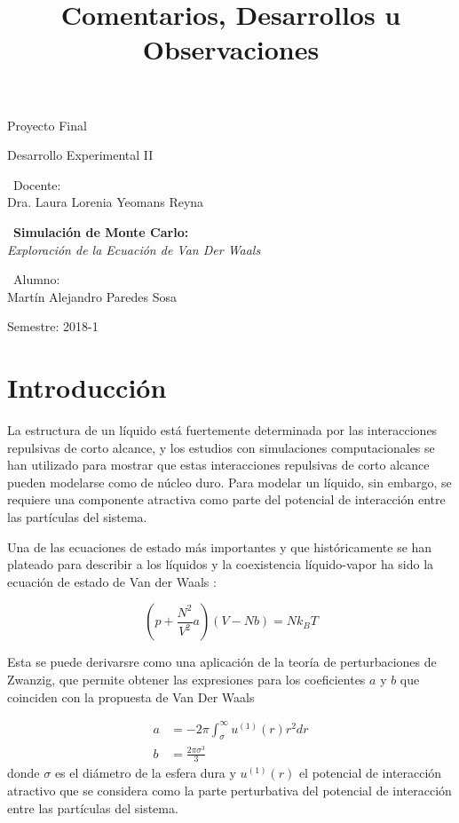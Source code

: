 \documentclass[12pt,letterpaper]{article}
\title{ Comentarios, Desarrollos u Observaciones  }
\begin{document}
\begin{titlepage}
	\centering
    \vspace*{2cm}
	{\Large Proyecto Final \par}
	\vfill
	{\Large Desarrollo Experimental II \par}
	\vfill
	{\large\ Docente:\\ Dra. Laura Lorenia Yeomans Reyna \par}
    \vfill
    {\large\ \textbf{Simulación de Monte Carlo:}\\ 
    \emph{Exploración de la Ecuación de Van Der Waals}\par}
    \vfill
    {\large\ Alumno:\\ Martín Alejandro Paredes Sosa \par}
	\vfill
	{\large Semestre: 2018-1\par}
\end{titlepage}

\section{Introducción}
	
	La estructura de un líquido está fuertemente determinada por las interacciones repulsivas de corto alcance, y  los estudios con simulaciones computacionales se han utilizado para mostrar que estas interacciones repulsivas de corto alcance pueden modelarse como de núcleo duro. Para modelar un líquido, sin embargo, se requiere una componente atractiva como parte del potencial de interacción entre las partículas del sistema.  

Una de las ecuaciones de estado más importantes y que históricamente se han plateado para describir a los líquidos y la coexistencia líquido-vapor ha sido la ecuación de estado de Van der Waals \cite{Modern}:

\begin{equation}
	\left( p + \frac{N^2}{V^2}a \right) \left( V -Nb \right) = Nk_B T
	\label{VanDerWaals}
\end{equation}

Esta se puede derivarsre como una aplicación de la teoría de perturbaciones de Zwanzig\cite{Stats}, que permite obtener las expresiones para los coeficientes $a$ y $b$ que coinciden con la propuesta de Van Der Waals \cite{Stats} 

\begin{align}
	a &= -2\pi \int_{\sigma}^{\infty} u^{(1)}(r)r^2dr \label{Coef_A_1} \\
	b &= \frac{2\pi\sigma^3}{3} \label{Coef_B_1}
\end{align}
donde $\sigma$ es el diámetro de la esfera dura y $u^{(1)}(r)$ el potencial de interacción atractivo que se considera como la parte perturbativa del potencial de interacción entre las partículas del sistema. 
\end{document}
